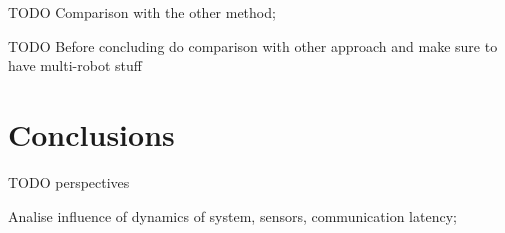 \documentclass[eprint]{actapoly}
\begin{document}
TODO Comparison with the other method;

TODO Before concluding do comparison with other approach and make sure to have 
multi-robot stuff

\section{Conclusions}





TODO perspectives

Analise influence of dynamics of system, sensors, communication latency;



\end{document}
